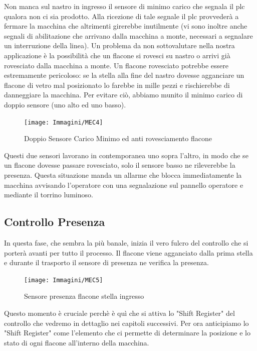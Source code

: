 \documentclass[12pt, a4paper, oneside]{book}
\begin{document}
 Non manca sul nastro in ingresso il sensore di minimo carico che segnala il plc qualora non ci sia prodotto. Alla ricezione di tale segnale il plc provvederà a fermare la macchina che altrimenti girerebbe inutilmente (vi sono inoltre anche segnali di abilitazione che arrivano dalla macchina a monte, necessari a segnalare un interruzione della linea).
Un problema da non sottovalutare nella nostra applicazione è la possibilità che un flacone si rovesci su nastro o arrivi già rovesciato dalla macchina a monte. Un flacone rovesciato potrebbe essere estremamente pericoloso: se la stella alla fine del nastro dovesse agganciare un flacone di vetro mal posizionato lo farebbe in mille pezzi e rischierebbe di danneggiare la macchina. Per evitare ciò, abbiamo munito il minimo carico di doppio sensore (uno alto ed uno basso). 

\begin{figure}[H]
	\centering
	\texttt{[image: Immagini/MEC4]}
	\label{mec4}
	\caption{ Doppio Sensore Carico Minimo ed anti rovesciamento flacone}
\end{figure}

 Questi due sensori lavorano in contemporanea uno sopra l'altro, in modo che se un flacone dovesse passare rovesciato, solo il sensore basso ne rileverebbe la presenza. Questa situazione manda un allarme che blocca immediatamente la macchina avvisando l'operatore con una segnalazione sul pannello operatore e mediante il torrino luminoso.  
   
\subsection{Controllo Presenza}
In questa fase, che sembra la più banale, inizia il vero fulcro del controllo che si porterà avanti per tutto il processo. Il flacone viene agganciato dalla prima stella e durante il trasporto il sensore di presenza ne verifica la presenza. 

\begin{figure}[H]
	\centering
	\texttt{[image: Immagini/MEC5]}
	\label{mec5}
	\caption{ Sensore presenza flacone stella ingresso}
\end{figure}

Questo momento è cruciale perchè è quì che si attiva lo "Shift Register" del controllo che vedremo in dettaglio nei capitoli successivi. Per ora anticipiamo lo "Shift Register" come l'elemento che ci permette di determinare la posizione e lo stato di ogni flacone all'interno della macchina.
\end{document}
